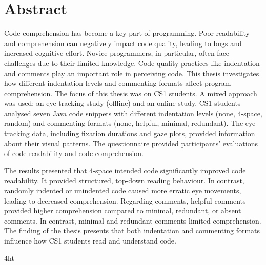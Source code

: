 \documentclass[14pt, a4paper, twoside, bibliography=totoc, headsepline, cleardoublepage=empty, parskip=half, draft=false]{scrbook}
\begin{document}
\cleardoublepage

\section*{Abstract}

Code comprehension has become a key part of programming. Poor readability and comprehension can negatively impact code quality, leading to bugs and increased cognitive effort. Novice programmers, in particular, often face challenges due to their limited knowledge. Code quality practices like indentation and comments play an important role in perceiving code. This thesis investigates how different indentation levels and commenting formats affect program comprehension. The focus of this thesis was on CS1 students.  A mixed approach was used: an eye-tracking study (offline) and an online study. CS1 students analysed seven Java code snippets with different indentation levels (none, 4-space, random) and commenting formats (none, helpful, minimal, redundant). The eye-tracking data, including fixation durations and gaze plots, provided information about their visual patterns. The questionnaire provided participants' evaluations of code readability and code comprehension. 

The results presented that 4-space intended code significantly improved code readability. It provided structured, top-down reading behaviour. In contrast, randomly indented or unindented code caused more erratic eye movements, leading to decreased comprehension. Regarding comments, helpful comments provided higher comprehension compared to minimal, redundant, or absent comments.  In contrast, minimal and redundant comments limited comprehension. The finding of the thesis presents that both indentation and commenting formats influence how CS1 students read and understand code.
\cleardoublepage



\iftex4ht
\else
\fi

%
%

%
%
%
\pagestyle{plain}
\tableofcontents
\end{document}
